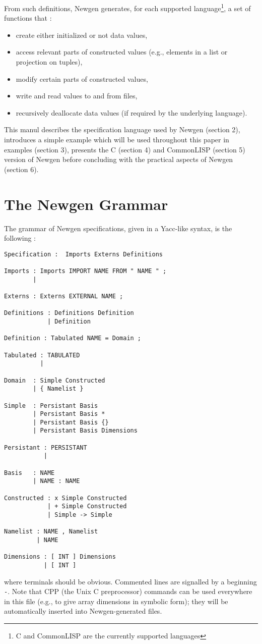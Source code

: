 From such definitions, Newgen generates, for each supported
language\footnote{C and CommonLISP are the currently supported
languages}, a set of functions that :
\begin{itemize}
\item create either initialized or not data values,
\item access relevant parts of constructed values (e.g., elements in a
list or projection on tuples),
\item modify certain parts of constructed values,
\item write and read values to and from files,
\item recursively deallocate data values (if required by the underlying
language). 
\end{itemize}

This manul describes the specification language used by Newgen (section
2), introduces a simple example which will be used throughout this paper
in examples (section 3), presents the C (section 4) and CommonLISP
(section 5) version of Newgen before concluding with the practical
aspects of Newgen (section 6).

\section{The Newgen Grammar}

The grammar of Newgen specifications, given in a Yacc-like syntax, is
the following :
\begin{verbatim}
Specification :  Imports Externs Definitions 

Imports : Imports IMPORT NAME FROM " NAME " ;
        |

Externs : Externs EXTERNAL NAME ;

Definitions : Definitions Definition
            | Definition

Definition : Tabulated NAME = Domain ;

Tabulated : TABULATED
          |

Domain  : Simple Constructed 
        | { Namelist }
        
Simple  : Persistant Basis
        | Persistant Basis *
        | Persistant Basis {}
        | Persistant Basis Dimensions 

Persistant : PERSISTANT
           |

Basis   : NAME 
        | NAME : NAME 

Constructed : x Simple Constructed 
            | + Simple Constructed 
            | Simple -> Simple

Namelist : NAME , Namelist 
         | NAME 

Dimensions : [ INT ] Dimensions 
           | [ INT ]
\end{verbatim}
where terminals should be obvious. Commented lines are signalled by a
beginning {\tt -}. Note that CPP (the Unix C preprocessor) commands can
be used everywhere in this file (e.g., to give array dimensions in
symbolic form); they will be automatically inserted into
Newgen-generated files.  

